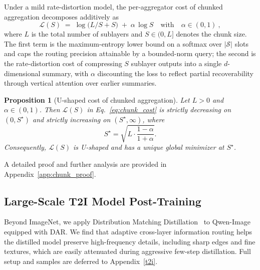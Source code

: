 \documentclass[]{ant_tech_report}
\newtheorem{proposition}{Proposition}
\begin{document}
Under a mild rate-distortion model, the per-aggregator cost of chunked aggregation decomposes additively as
\begin{equation}
\mathcal{L}(S) \;=\; \log\bigl(L/S + S\bigr) \;+\; \alpha \, \log S 
\quad\text{with}\quad \alpha \in (0, 1) \ ,
\label{eq:chunk_cost}
\end{equation}
where $L$ is the total number of sublayers and $S \in (0, L]$ denotes the chunk size. The first term is the maximum-entropy lower bound on a softmax over $|\mathcal{S}|$ slots and caps the routing precision attainable by a bounded-norm query; the second is the rate-distortion cost of compressing $S$ sublayer outputs into a single $d$-dimensional summary, with $\alpha$ discounting the loss to reflect partial recoverability through vertical attention over earlier summaries.

\begin{proposition}[U-shaped cost of chunked aggregation] \label{prop:u_shape}
Let $L>0$ and $\alpha\in(0,1)$. Then $\mathcal{L}(S)$ in
Eq.~\eqref{eq:chunk_cost} is strictly decreasing on $(0,S^\star)$ and strictly
increasing on $(S^\star,\infty)$, where
\begin{equation}
S^\star=\sqrt{L \cdot \frac{1-\alpha}{1+\alpha}}.
\label{eq:S_star}
\end{equation}
Consequently, $\mathcal{L}(S)$ is U-shaped and has a unique global minimizer at
$S^\star$.
\end{proposition}

A detailed proof and further analysis are provided in Appendix~\ref{app:chunk_proof}.

\subsection{Large-Scale T2I Model Post-Training}

Beyond ImageNet, we apply Distribution Matching Distillation~\citep{yin2024one,yin2024improved} to Qwen-Image~\citep{wu2025qwen} equipped with \textsc{DAR}. We find that adaptive cross-layer information routing helps the distilled model preserve high-frequency details, including sharp edges and fine textures, which are easily attenuated during aggressive few-step distillation. Full setup and samples are deferred to Appendix~\ref{t2i}.
\end{document}
